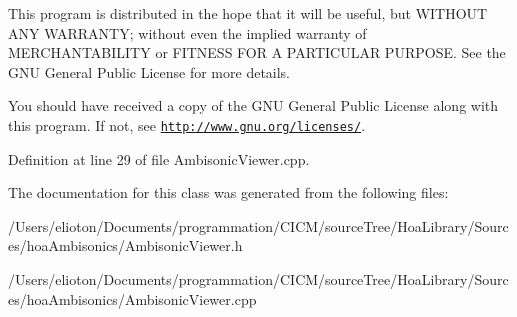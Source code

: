 This program is distributed in the hope that it will be useful, but W\-I\-T\-H\-O\-U\-T A\-N\-Y W\-A\-R\-R\-A\-N\-T\-Y; without even the implied warranty of M\-E\-R\-C\-H\-A\-N\-T\-A\-B\-I\-L\-I\-T\-Y or F\-I\-T\-N\-E\-S\-S F\-O\-R A P\-A\-R\-T\-I\-C\-U\-L\-A\-R P\-U\-R\-P\-O\-S\-E. See the G\-N\-U General Public License for more details.

You should have received a copy of the G\-N\-U General Public License along with this program. If not, see \href{http://www.gnu.org/licenses/}{\tt http\-://www.\-gnu.\-org/licenses/}. 

Definition at line 29 of file Ambisonic\-Viewer.\-cpp.



The documentation for this class was generated from the following files\-:\begin{DoxyCompactItemize}
\item 
/\-Users/elioton/\-Documents/programmation/\-C\-I\-C\-M/source\-Tree/\-Hoa\-Library/\-Sources/hoa\-Ambisonics/Ambisonic\-Viewer.\-h\item 
/\-Users/elioton/\-Documents/programmation/\-C\-I\-C\-M/source\-Tree/\-Hoa\-Library/\-Sources/hoa\-Ambisonics/Ambisonic\-Viewer.\-cpp\end{DoxyCompactItemize}
